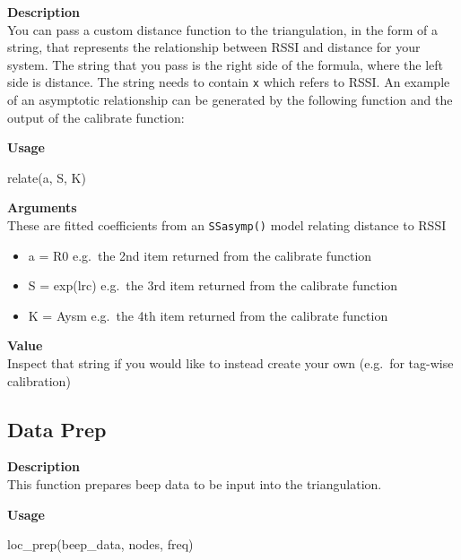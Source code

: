\documentclass[
]{book}
\newenvironment{Shaded}{\begin{snugshade}}{\end{snugshade}}
\newcommand{\FunctionTok}[1]{\textcolor[rgb]{0.00,0.00,0.00}{#1}}
\newcommand{\NormalTok}[1]{#1}
\providecommand{\tightlist}{%
  \setlength{\itemsep}{0pt}\setlength{\parskip}{0pt}}
\begin{document}
\textbf{Description}\\
You can pass a custom distance function to the triangulation, in the form of a string, that represents the relationship between RSSI and distance for your system. The string that you pass is the right side of the formula, where the left side is distance. The string needs to contain \texttt{x} which refers to RSSI. An example of an asymptotic relationship can be generated by the following function and the output of the calibrate function:

\textbf{Usage}

\begin{Shaded}
\begin{Highlighting}[]
\FunctionTok{relate}\NormalTok{(a, S, K)}
\end{Highlighting}
\end{Shaded}

\textbf{Arguments}\\
These are fitted coefficients from an \texttt{SSasymp()} model relating distance to RSSI

\begin{itemize}
\tightlist
\item
  a = R0 e.g.~the 2nd item returned from the calibrate function\\
\item
  S = exp(lrc) e.g.~the 3rd item returned from the calibrate function\\
\item
  K = Aysm e.g.~the 4th item returned from the calibrate function
\end{itemize}

\textbf{Value}\\
Inspect that string if you would like to instead create your own (e.g.~for tag-wise calibration)

\hypertarget{data-prep}{%
\subsection{Data Prep}\label{data-prep}}

\textbf{Description}\\
This function prepares beep data to be input into the triangulation.

\textbf{Usage}

\begin{Shaded}
\begin{Highlighting}[]
\FunctionTok{loc\_prep}\NormalTok{(beep\_data, nodes, freq) }
\end{Highlighting}
\end{Shaded}
\end{document}
